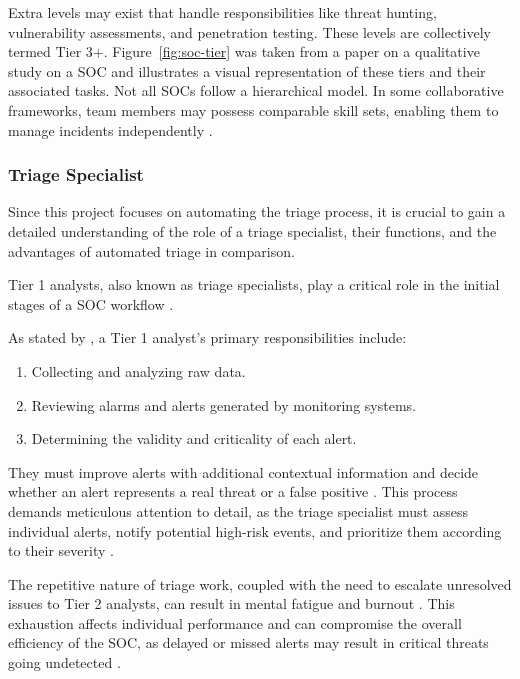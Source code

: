 Extra levels may exist that handle responsibilities like threat hunting, vulnerability assessments, and penetration testing. 
These levels are collectively termed Tier 3+. 
Figure~\ref{fig:soc-tier} was taken from a paper on a qualitative study on a \gls{SOC} \parencite{Kokulu2019} and illustrates a visual representation of these tiers and their associated tasks. 
Not all \gls{SOC}s follow a hierarchical model. 
In some collaborative frameworks, team members may possess comparable skill sets, enabling them to manage incidents independently \parencite{Kokulu2019}.

\subsubsection{Triage Specialist}

Since this project focuses on automating the triage process, it is crucial to gain a detailed understanding of the role of a triage specialist, their functions, and the advantages of automated triage in comparison.

Tier 1 analysts, also known as triage specialists, play a critical role in the initial stages of a \gls{SOC} workflow \parencite{Vielberth2020}. 

As stated by \textcite{Vielberth2020}, a Tier 1 analyst's primary responsibilities include:
\begin{enumerate}
    \item Collecting and analyzing raw data.
    \item Reviewing alarms and alerts generated by monitoring systems.
    \item Determining the validity and criticality of each alert.
\end{enumerate}

They must improve alerts with additional contextual information and decide whether an alert represents a real threat or a false positive \parencite{Hamornik2018, Sundaramurthy2014}. This process demands meticulous attention to detail, as the triage specialist must assess individual alerts, notify potential high-risk events, and prioritize them according to their severity \parencite{Tao2018}. 

The repetitive nature of triage work, coupled with the need to escalate unresolved issues to Tier 2 analysts, can result in mental fatigue and burnout \parencite{Tines2023, Iamnitchi2017}. This exhaustion affects individual performance and can compromise the overall efficiency of the \gls{SOC}, as delayed or missed alerts may result in critical threats going undetected \parencite{CriticalStart2019}.

